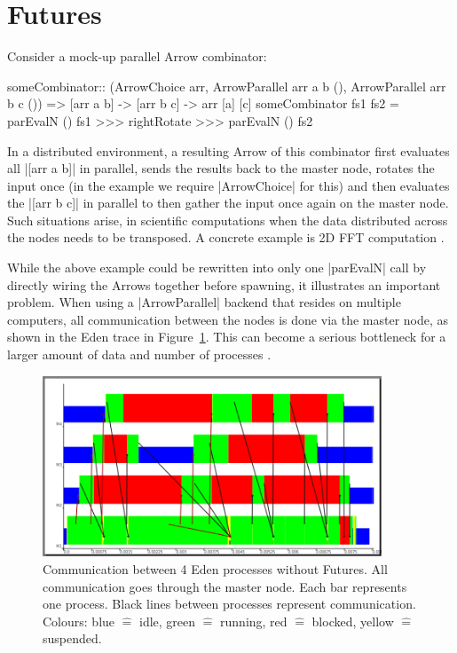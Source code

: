 \section{Futures} \label{sec:futures}\label{futures}
Consider a mock-up parallel Arrow combinator:
\begin{code}
someCombinator:: (ArrowChoice arr,
	ArrowParallel arr a b (),
	ArrowParallel arr b c ()) =>
	[arr a b] -> [arr b c] -> arr [a] [c]
someCombinator fs1 fs2 =
	parEvalN () fs1 >>>
	rightRotate >>>
	parEvalN () fs2
\end{code}

In a distributed environment, a resulting Arrow of this combinator first evaluates all |[arr a b]| in parallel, sends the results back to the master node, rotates the input once (in the example we require |ArrowChoice| for this) and then evaluates the |[arr b c]| in parallel to then gather the input once again on the master node.
Such situations arise, \eg in scientific computations when the data distributed across the nodes needs to be transposed. A concrete example is 2D FFT computation \cite{Gorlatch,Berthold2009-fft}.

While the above example could be rewritten into only one |parEvalN| call by directly wiring the Arrows together before spawning, it illustrates an important problem. When using a |ArrowParallel| backend that resides on multiple computers, all communication between the nodes is done via the master node, as shown in the Eden trace in Figure~\ref{fig:withoutFutures}. This can become a serious bottleneck
for a larger amount of data and number of processes \citep[as e.g.][showcases]{Berthold2009-fft}.
\begin{figure}[ht]
	\centering
	\includegraphics[width=0.9\textwidth]{images/withoutFutures}
	\caption[without Futures]{Communication between 4 Eden processes without Futures. All communication goes through the master node. Each bar represents one process. Black lines between processes represent communication. Colours: blue $\hat{=}$ idle, green $\hat{=}$ running, red  $\hat{=}$ blocked, yellow $\hat{=}$ suspended.}
	\label{fig:withoutFutures}
\end{figure}

